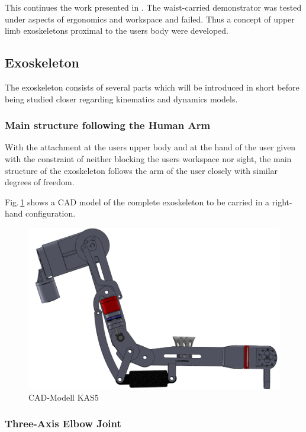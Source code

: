 \documentclass[letterpaper, 10 pt, conference]{ieeeconf}  %
\begin{document}
This continues the work presented in \cite{PetereitAlbJerSch2012}. 
The waist-carried demonstrator was tested under aspects of ergonomics and workspace and failed. Thus a concept of upper limb exoskeletons proximal to the users body were developed.

\subsection{Exoskeleton}

The exoskeleton consists of several parts which will be introduced in short before being studied closer regarding kinematics and dynamics models.

\subsubsection{Main structure following the Human Arm}

With the attachment at the users upper body and at the hand of the user given with the constraint of neither blocking the users workspace nor sight, the main structure of the exoskeleton follows the arm of the user closely with similar degrees of freedom.

Fig.\,\ref{fig:KAS5_CAD} shows a CAD model of the complete exoskeleton to be carried in a right-hand configuration.


\begin{figure}[tb!]
    \includegraphics[width=\linewidth]{figures/KAS5_Seitenansicht_CAD_Ausschnitt_transp.png}
    \caption{CAD-Modell KAS5}
    \label{fig:KAS5_CAD}
\end{figure} 

\subsubsection{Three-Axis Elbow Joint}
\end{document}

